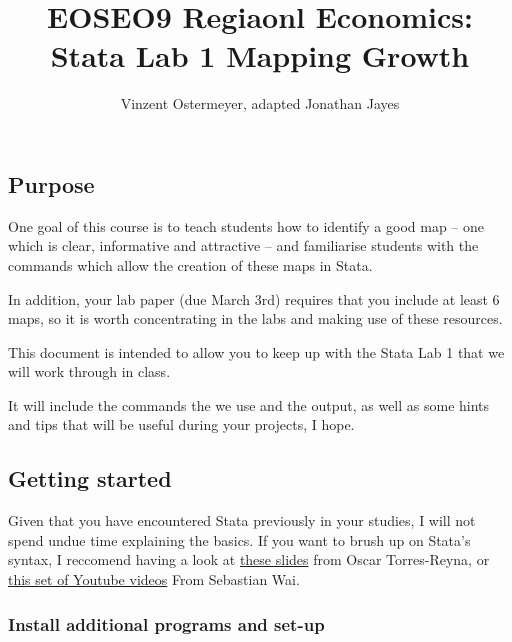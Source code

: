 \documentclass[
  letterpaper,
  DIV=11,
  numbers=noendperiod]{scrartcl}
\title{EOSEO9 Regiaonl Economics: Stata Lab 1 Mapping Growth}
\author{Vinzent Ostermeyer, adapted Jonathan Jayes}
\date{}
\begin{document}
\maketitle
\ifdefined\Shaded\renewenvironment{Shaded}{\begin{tcolorbox}[breakable, sharp corners, boxrule=0pt, borderline west={3pt}{0pt}{shadecolor}, interior hidden, enhanced, frame hidden]}{\end{tcolorbox}}\fi

\hypertarget{purpose}{%
\subsection{Purpose}\label{purpose}}

One goal of this course is to teach students how to identify a good map
-- one which is clear, informative and attractive -- and familiarise
students with the commands which allow the creation of these maps in
Stata.

In addition, your lab paper (due March 3rd) requires that you include at
least 6 maps, so it is worth concentrating in the labs and making use of
these resources.

This document is intended to allow you to keep up with the Stata Lab 1
that we will work through in class.

It will include the commands the we use and the output, as well as some
hints and tips that will be useful during your projects, I hope.

\hypertarget{getting-started}{%
\subsection{Getting started}\label{getting-started}}

Given that you have encountered Stata previously in your studies, I will
not spend undue time explaining the basics. If you want to brush up on
Stata's syntax, I reccomend having a look at
\href{https://github.com/j-jayes/EOSE09/blob/b8444dd95783f4434ab63c4ad28b0f3033d4fd0a/resources/StataTutorial.pdf}{these
slides} from Oscar Torres-Reyna, or
\href{https://www.youtube.com/watch?v=oXsPgQe-aqs\&ab_channel=SebastianWaiEcon}{this
set of Youtube videos} From Sebastian Wai.

\hypertarget{install-additional-programs-and-set-up}{%
\subsubsection{Install additional programs and
set-up}\label{install-additional-programs-and-set-up}}
\end{document}
